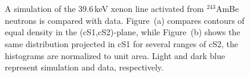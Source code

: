 
\appendix*

\section{}

\begin{figure}[tbh!]
	\caption{A simulation of the 39.6\,keV  xenon line activated from $^{243}$AmBe neutrons is compared with  data.
		 Figure~(a) compares contours of equal density in the (cS1,cS2)-plane, while Figure~(b) shows the same distribution projected in cS1 for
		 several ranges of cS2, the histograms are normalized to unit area. Light and dark blue represent simulation and data, respectively.
		}
		
  \label{fig:mc_comp}
\end{figure}

